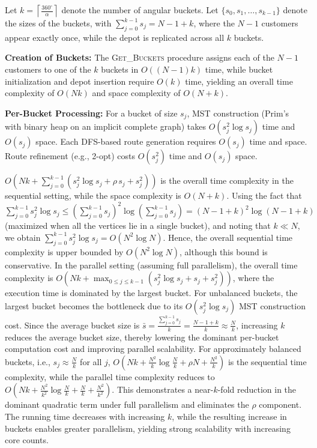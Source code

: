 



Let $k = \left\lceil \frac{360^\circ}{\alpha} \right\rceil$ denote the number of angular buckets. Let $\{s_0, s_1, \dots, \allowbreak s_{k-1}\}$ denote the sizes of the buckets, with $\sum_{j=0}^{k-1} s_j = N - 1 + k$, where the $N-1$ customers appear exactly once, while the depot is replicated across all $k$ buckets.

\textbf{Creation of Buckets:} The \textsc{Get\_Buckets} procedure assigns each of the $N-1$ customers to one of the $k$ buckets in $O((N-1)k)$ time, while bucket initialization and depot insertion require $O(k)$ time, yielding an overall time complexity of $O(Nk)$ and space complexity of $O(N + k)$.

\textbf{Per-Bucket Processing:} For a bucket of size $s_j$, MST construction (Prim’s with binary heap on an implicit complete graph) takes $O(s_j^2 \log s_j)$ time and $O(s_j)$ space. Each DFS-based route generation requires $O(s_j)$ time and space. Route refinement (e.g., 2-opt) costs $O(s_j^2)$ time and $O(s_j)$ space. 

$O\!\left(Nk + \sum_{j=0}^{k-1} \left( s_j^2 \log s_j + \rho\, s_j + s_j^2 \right)\right)$ is the overall time complexity in the sequential setting, while the space complexity is $O(N + k)$. Using the fact that $\sum_{j=0}^{k-1} s_j^2 \log s_j \le \left(\sum_{j=0}^{k-1} s_j\right)^2 \log\!\left(\sum_{j=0}^{k-1} s_j\right) = (N-1+k)^2 \log(N-1+k)$ (maximized when all the vertices lie in a single bucket), and noting that $k \ll N$, we obtain $\sum_{j=0}^{k-1} s_j^2 \log s_j = O(N^2 \log N)$. Hence, the overall sequential time complexity is upper bounded by $O(N^2 \log N)$, although this bound is conservative. In the parallel setting (assuming full parallelism), the overall time complexity is $O\!\left(Nk + \max_{0 \le j \le k-1} \left( s_j^2 \log s_j + s_j + s_j^2 \right)\right)$, where the execution time is dominated by the largest bucket.  For unbalanced buckets, the largest bucket becomes the bottleneck due to its $O(s_j^2 \log s_j)$ MST construction cost. Since the average bucket size is $\bar{s} = \frac{\sum_{j=0}^{k-1} s_j}{k} = \frac{N-1+k}{k} \approx \frac{N}{k}$, increasing $k$ reduces the average bucket size, thereby lowering the dominant per-bucket computation cost and improving parallel scalability. For approximately balanced buckets, i.e., $s_j \approx \frac{N}{k}$ for all $j$, $O\!\left(Nk + \frac{N^2}{k} \log \frac{N}{k} + \rho N  + \frac{N^2}{k} \right)$ is the sequential time complexity, while the parallel time complexity reduces to $O\!\left(Nk + \frac{N^2}{k^2} \log \frac{N}{k} + \frac{N}{k} + \frac{N^2}{k^2}\right)$. This demonstrates a near-$k$-fold reduction in the dominant quadratic term under full parallelism and eliminates the $\rho$ component. The running time decreases with increasing $k$, while the resulting increase in buckets enables greater parallelism, yielding strong scalability with increasing core counts.


